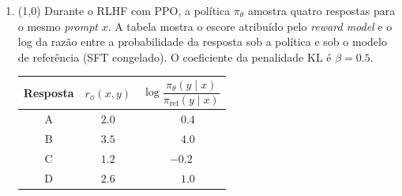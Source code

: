 \documentclass[11pt,a4paper]{article}
\begin{document}
\begin{enumerate}[1)]
\begin{center}
\end{center}

Qual classe o CLIP prevê, e qual é a similaridade $s_k = \mathbf{u}^\top \mathbf{v}_k$ da classe prevista?

\begin{enumerate}[a)]
    \item Gato, com $s = 100$.
    \item Raposa, com $s = 0.923$.
    \item Cachorro, com $s = 25.2$.
    \item Gato, com $s = 0.385$.
    \item Raposa, com $s = 36$.
    \item Cachorro, com $s = 12.6$.
    \item Cachorro, com $s = 1.938$.
    \item Cachorro, com $s = 0.969$.
\end{enumerate}

\item (1{,}0) Durante o RLHF com PPO, a política $\pi_\theta$ amostra quatro respostas para o mesmo \textit{prompt} $x$. A tabela mostra o escore atribuído pelo \textit{reward model} e o log da razão entre a probabilidade da resposta sob a política e sob o modelo de referência (SFT congelado). O coeficiente da penalidade KL é $\beta = 0.5$.

\begin{center}
\begin{tabular}{|c|c|c|}
\hline
Resposta & $r_\phi(x, y)$ & $\log \dfrac{\pi_\theta(y \mid x)}{\pi_\text{ref}(y \mid x)}$ \\\hline
A & $2.0$ & $\phantom{-}0.4$ \\
B & $3.5$ & $\phantom{-}4.0$ \\
C & $1.2$ & $-0.2$ \\
D & $2.6$ & $\phantom{-}1.0$ \\\hline
\end{tabular}
\end{center}


\end{enumerate}
\end{document}
